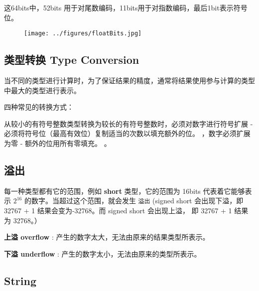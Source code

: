 这64bits中，52bits 用于对尾数编码，11bits用于对指数编码，最后1bit表示符号位。

\begin{figure}[h]
	\centering
	\texttt{[image: ../figures/floatBits.jpg]}
	\label{fig:floatBtis}
\end{figure}



\subsection{类型转换 Type Conversion}
当不同的类型进行计算时，为了保证结果的精度，通常将结果使用参与计算的类型中最大的类型进行表示。

四种常见的转换方式：
\begin{enum}
\item 从较小的有符号整数类型转换为较长的有符号整数时，必须对数字进行符号扩展 - 必须将符号位（最高有效位）复制适当的次数以填充额外的位。
，数字必须扩展为零 - 额外的位用所有零填充。
。

\end{enum}

\subsection{溢出}
每一种类型都有它的范围，例如 \textbf{short} 类型，它的范围为 16bits 代表着它能够表示 $2^{16}$ 的数字。当超过这个范围，就会发生 \texttt{溢出} (signed short 会出现下溢，即32767 + 1 结果会变为-32768。而 signed short 会出现上溢， 即 32767 + 1 结果为 32768。）

\textbf{上溢 overflow} : 产生的数字太大，无法由原来的结果类型所表示。

\textbf{下溢 underflow} : 产生的数字太小，无法由原来的类型所表示。

\subsection{String}

